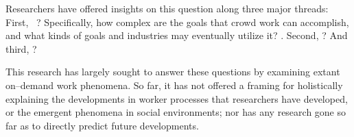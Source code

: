 \documentclass[trackingWork]{subfiles}
\begin{document}
Researchers have offered insights on this question along three major threads:
First, ~\cite{crowdForgeKittur}?
      Specifically, how complex are the goals that crowd work can accomplish, and what kinds of goals and industries may eventually utilize it?
      \cite{foundry,suzukiAtelier,KimStoria,yuanAlmost,YuEncouragingOutside,
            Nebeling:2016:WCW:2858036.2858169,
            Hahn:2016:KAB:2858036.2858364}.
Second, 
      \cite{embracingErrorKrishna,bernsteinSoylent,sensitiveTasks,
            LykourentzouPersonalityMatters,KucherbaevReLauncher,
            Law:2016:CKC:2858036.2858144,Cai:2016:CRI:2858036.2858237,
            Chang:2016:ACC:2858036.2858411,Newell:2016:OMA:2858036.2858490}?
And third, 
      \cite{turkopticon,storiesIraniSilberman,dynamo,crowdcollab,
            whyWouldAnyoneBrewer,takingAHITMcInnis}?

This research has largely sought to answer these questions by examining extant on--demand work phenomena.
So far, it has not offered a framing for holistically explaining
the developments in worker processes that researchers have developed, or
the emergent phenomena in social environments;
nor has any research
gone so far as to directly predict future developments.
\end{document}
